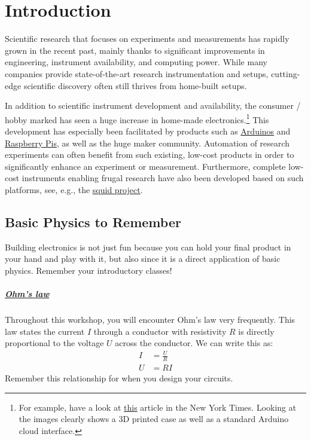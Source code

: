 
\chapter{Introduction}

Scientific research that focuses on experiments and measurements has rapidly grown in the recent past, mainly thanks to significant improvements in engineering, instrument availability, and computing power. While many companies provide state-of-the-art research instrumentation and setups, cutting-edge scientific discovery often still thrives from home-built setups. 

In addition to scientific instrument development and availability, the consumer / hobby marked has seen a huge increase in home-made electronics.\footnote{For example, have a look at \href{https://www.nytimes.com/2021/10/10/health/coronavirus-ventilation-carbon-dioxide.html}{this} article in the New York Times. Looking at the images clearly shows a 3D printed case as well as a standard Arduino cloud interface.} This development has especially been facilitated by products such as \href{https://www.arduino.cc/}{Arduinos} and \href{https://www.raspberrypi.org/}{Raspberry Pis}, as well as the huge maker community. Automation of research experiments can often benefit from such existing, low-cost products in order to significantly enhance an experiment or measurement. Furthermore, complete low-cost instruments enabling frugal research have also been developed based on such platforms, see, e.g., the \href{https://squid-imaging.org/}{\ac{squid} project}.

\section{Basic Physics to Remember}

Building electronics is not just fun because you can hold your final product in your hand and play with it, but also since it is a direct application of basic physics. Remember your introductory classes! 

\paragraph{\href{https://en.wikipedia.org/wiki/Ohm's_law}{Ohm's law}} Throughout this workshop, you will encounter Ohm's law very frequently. This law states the current $I$ through a conductor with resistivity $R$ is directly proportional to the voltage $U$ across the conductor. We can write this as:
\begin{align}
    I &= \frac{U}{R}\\
    U &= RI \label{eqn:uri}
\end{align}
Remember this relationship for when you design your circuits.

